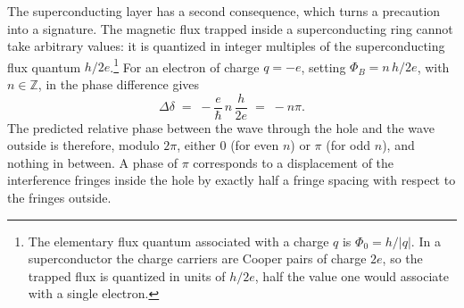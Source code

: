 The superconducting layer has a second consequence, which turns a precaution
into a signature. The magnetic flux trapped inside a superconducting ring
cannot take arbitrary values: it is quantized in integer multiples of the
superconducting flux quantum $h/2e$.\footnote{The elementary flux quantum
	associated with a charge $q$ is $\Phi_0 = h/|q|$. In a superconductor the charge
	carriers are Cooper pairs of charge $2e$, so the trapped flux is quantized in
	units of $h/2e$, half the value one would associate with a single electron.}
For an electron of charge $q = -e$, setting $\Phi_B = n\,h/2e$, with
$n\in\mathbb Z$, in the phase difference gives
\[
	\Delta\delta \;=\; -\frac{e}{\hbar}\,n\,\frac{h}{2e} \;=\; -n\pi .
\]
The predicted relative phase between the wave through the hole and the wave
outside is therefore, modulo $2\pi$, either $0$ (for even $n$) or $\pi$ (for odd $n$), and
nothing in between. A phase of $\pi$ corresponds to a displacement of the
interference fringes inside the hole by exactly half a fringe spacing with
respect to the fringes outside.

